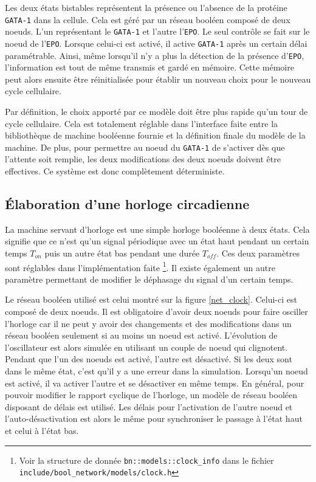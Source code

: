 \documentclass[11pt, a4paper]{article}
\begin{document}
Les deux états bistables représentent la présence ou l'absence de la protéine
\texttt{GATA-1} dans la cellule. Cela est géré par un réseau booléen composé de
deux noeuds. L'un représentant le \texttt{GATA-1} et l'autre l'\texttt{EPO}. Le
seul contrôle se fait sur le noeud de l'\texttt{EPO}. Lorsque celui-ci est
activé, il active \texttt{GATA-1} après un certain délai paramétrable. Ainsi,
même lorsqu'il n'y a plus la détection de la présence d'\texttt{EPO},
l'information est tout de même transmis et gardé en mémoire. Cette mémoire peut
alors ensuite être réinitialisée pour établir un nouveau choix pour le nouveau
cycle cellulaire. %

Par définition, le choix apporté par ce modèle doit être plus rapide qu'un tour
de cycle cellulaire. Cela est totalement réglable dans l'interface faite entre
la bibliothèque de machine booléenne fournie et la définition finale du modèle
de la machine. De plus, pour permettre au noeud du \texttt{GATA-1} de s'activer
dès que l'attente soit remplie, les deux modifications des deux noeuds doivent
être effectives. Ce système est donc complètement déterministe.

\subsection{Élaboration d'une horloge circadienne}
La machine servant d'horloge est une simple horloge booléenne à deux états.
Cela signifie que ce n'est qu'un signal périodique avec un état haut pendant un
certain temps $T_{on}$ puis un autre état bas pendant une durée $T_{off}$.
Ces deux paramètres sont réglables dans l'implémentation faite \footnote{Voir
    la structure de donnée \texttt{bn::models::clock\_info} dans le fichier
\texttt{include/bool\_network/models/clock.h}}. Il existe également un autre
paramètre permettant de modifier le déphasage du signal d'un certain temps.

Le réseau booléen utilisé est celui montré sur la figure \ref{net_clock}.
Celui-ci est composé de deux noeuds. Il est obligatoire d'avoir deux noeuds
pour faire osciller l'horloge car il ne peut y avoir des changements et des
modifications dans un réseau booléen seulement si au moins un noeud est activé.
L'évolution de l'oscillateur est alors simulée en utilisant un couple de noeud
qui clignotent. Pendant que l'un des noeuds est activé, l'autre est désactivé.
Si les deux sont dans le même état, c'est qu'il y a une erreur dans la
simulation. Lorsqu'un noeud est activé, il va activer l'autre et se désactiver
en même temps. En général, pour pouvoir modifier le rapport cyclique de
l'horloge, un modèle de réseau booléen disposant de délais est utilisé. Les
délais pour l'activation de l'autre noeud et l'auto-désactivation est alors le
même pour synchroniser le passage à l'état haut et celui à l'état bas.
\end{document}
